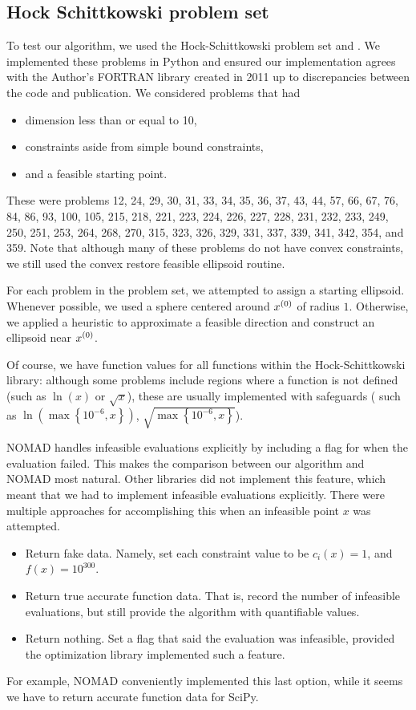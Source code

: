 \subsection{Hock Schittkowski problem set}

To test our algorithm, we used the Hock-Schittkowski problem set \cite{Hock1980} and \cite{Schittkowski:1987:MTE:27135}.
We implemented these problems in Python and ensured our implementation agrees with the Author's FORTRAN library created in 2011 
up to discrepancies between the code and publication.
We considered problems that had
\begin{itemize}
\item dimension less than or equal to 10,
\item constraints aside from simple bound constraints,
\item and a feasible starting point.
\end{itemize}

These were problems
12,
24,
29,
30,
31,
33,
34,
35,
36,
37,
43,
44,
57,
66,
67,
76,
84,
86,
93,
100,
105,
215,
218,
221,
223,
224,
226,
227,
228,
231,
232,
233,
249,
250,
251,
253,
264,
268,
270,
315,
323,
326,
329,
331,
337,
339,
341,
342,
354,
and 359.
Note that although many of these problems do not have convex constraints, we still used the convex restore feasible ellipsoid routine.

For each problem in the problem set, we attempted to assign a starting ellipsoid.
Whenever possible, we used a sphere centered around ${x^{(0)}}$ of radius $1$.
Otherwise, we applied a heuristic to approximate a feasible direction and construct an ellipsoid near ${x^{(0)}}$.

Of course, we have function values for all functions within the Hock-Schittkowski library:
although some problems include regions where a function is not defined (such as $\ln(x)$ or $\sqrt{x}$), 
these are usually implemented with safeguards (
such as $\ln\left(\max\left\{10^{-6}, x\right\}\right)$, $\sqrt{\max\left\{10^{-6}, x\right\}}$).

NOMAD handles infeasible evaluations explicitly by including a flag for when the evaluation failed.
This makes the comparison between our algorithm and NOMAD most natural.
Other libraries did not implement this feature, which meant that we had to implement infeasible evaluations explicitly.
There were multiple approaches for accomplishing this when an infeasible point $x$ was attempted.

\begin{itemize}
\item Return fake data. Namely, set each constraint value to be $c_i(x) = 1$, and $f(x) = 10^{300}$.
\item Return true accurate function data. That is, record the number of infeasible evaluations, but still provide the algorithm with quantifiable values.
\item Return nothing. Set a flag that said the evaluation was infeasible, provided the optimization library implemented such a feature.
\end{itemize}
For example, NOMAD conveniently implemented this last option, while it seems we have to return accurate function data for SciPy.


